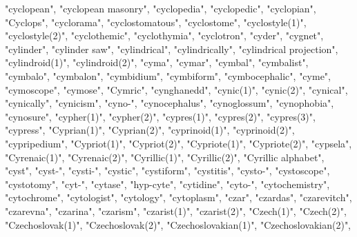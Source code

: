 "cyclopean",
"cyclopean masonry",
"cyclopedia",
"cyclopedic",
"cyclopian",
"Cyclops",
"cyclorama",
"cyclostomatous",
"cyclostome",
"cyclostyle(1)",
"cyclostyle(2)",
"cyclothemic",
"cyclothymia",
"cyclotron",
"cyder",
"cygnet",
"cylinder",
"cylinder saw",
"cylindrical",
"cylindrically",
"cylindrical projection",
"cylindroid(1)",
"cylindroid(2)",
"cyma",
"cymar",
"cymbal",
"cymbalist",
"cymbalo",
"cymbalon",
"cymbidium",
"cymbiform",
"cymbocephalic",
"cyme",
"cymoscope",
"cymose",
"Cymric",
"cynghanedd",
"cynic(1)",
"cynic(2)",
"cynical",
"cynically",
"cynicism",
"cyno-",
"cynocephalus",
"cynoglossum",
"cynophobia",
"cynosure",
"cypher(1)",
"cypher(2)",
"cypres(1)",
"cypres(2)",
"cypres(3)",
"cypress",
"Cyprian(1)",
"Cyprian(2)",
"cyprinoid(1)",
"cyprinoid(2)",
"cypripedium",
"Cypriot(1)",
"Cypriot(2)",
"Cypriote(1)",
"Cypriote(2)",
"cypsela",
"Cyrenaic(1)",
"Cyrenaic(2)",
"Cyrillic(1)",
"Cyrillic(2)",
"Cyrillic alphabet",
"cyst",
"cyst-",
"cysti-",
"cystic",
"cystiform",
"cystitis",
"cysto-",
"cystoscope",
"cystotomy",
"cyt-",
"cytase",
"hyp-cyte",
"cytidine",
"cyto-",
"cytochemistry",
"cytochrome",
"cytologist",
"cytology",
"cytoplasm",
"czar",
"czardas",
"czarevitch",
"czarevna",
"czarina",
"czarism",
"czarist(1)",
"czarist(2)",
"Czech(1)",
"Czech(2)",
"Czechoslovak(1)",
"Czechoslovak(2)",
"Czechoslovakian(1)",
"Czechoslovakian(2)",
